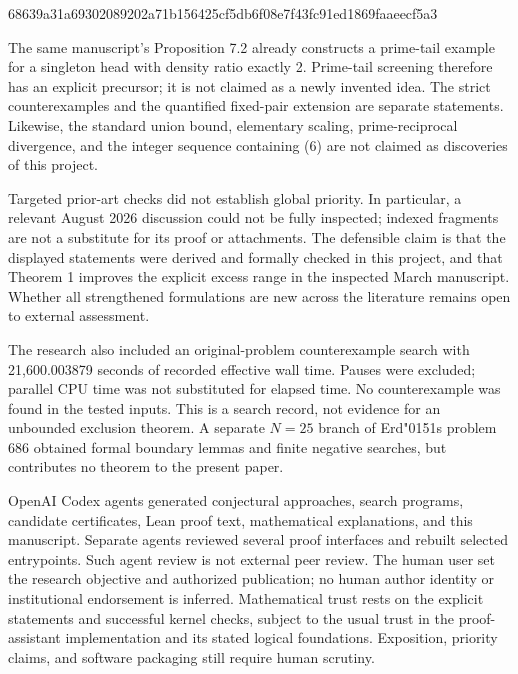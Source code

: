 \documentclass[
  11pt,
]{article}
\newenvironment{Shaded}{}{}
\newcommand{\NormalTok}[1]{#1}
\newcommand{\odoubleacute}{{\accentfont\char"0151}}
\begin{document}
\begin{Shaded}
\begin{Highlighting}[]
\NormalTok{68639a31a69302089202a71b156425cf5db6f08e7f43fc91ed1869faaeecf5a3}
\end{Highlighting}
\end{Shaded}

The same manuscript's Proposition 7.2 already constructs a prime-tail
example for a singleton head with density ratio exactly 2. Prime-tail
screening therefore has an explicit precursor; it is not claimed as a
newly invented idea. The strict counterexamples and the quantified
fixed-pair extension are separate statements. Likewise, the standard
union bound, elementary scaling, prime-reciprocal divergence, and the
integer sequence containing (6) are not claimed as discoveries of this
project.

Targeted prior-art checks did not establish global priority. In
particular, a relevant August 2026 discussion could not be fully
inspected; indexed fragments are not a substitute for its proof or
attachments. The defensible claim is that the displayed statements were
derived and formally checked in this project, and that Theorem 1
improves the explicit excess range in the inspected March manuscript.
Whether all strengthened formulations are new across the literature
remains open to external assessment.

The research also included an original-problem counterexample search
with 21,600.003879 seconds of recorded effective wall time. Pauses were
excluded; parallel CPU time was not substituted for elapsed time. No
counterexample was found in the tested inputs. This is a search record,
not evidence for an unbounded exclusion theorem. A separate \(N=25\)
branch of Erd\texorpdfstring{\odoubleacute}{o}s problem 686 obtained formal boundary lemmas and finite
negative searches, but contributes no theorem to the present paper.

OpenAI Codex agents generated conjectural approaches, search programs,
candidate certificates, Lean proof text, mathematical explanations, and
this manuscript. Separate agents reviewed several proof interfaces and
rebuilt selected entrypoints. Such agent review is not external peer
review. The human user set the research objective and authorized
publication; no human author identity or institutional endorsement is
inferred. Mathematical trust rests on the explicit statements and
successful kernel checks, subject to the usual trust in the
proof-assistant implementation and its stated logical foundations.
Exposition, priority claims, and software packaging still require human
scrutiny.
\end{document}

